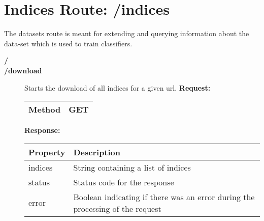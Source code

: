 \section{Indices Route: /indices}
The datasets route is meant for extending and querying information about the data-set which is used to train classifiers. 

\begin{description}


\item [{\large \textbf{/}}]
\item [{\large \textbf{/download}}]
Starts the download of all indices for a given url.
\newline
\newline
\textbf{Request:}
\newline
\newline
\begin{tabular}{ | l | l |}
\hline
Method & GET\\ \hline
\end{tabular}
\newline
\newline
\textbf{Response:}
\newline
\newline
\resizebox{\textwidth}{!} {
\begin{tabular}{ | l | l |}
\hline
\textbf{Property} & \textbf{Description}\\ \hline
indices & String containing a list of indices\\ \hline
status & Status code for the response\\ \hline
error & Boolean indicating if there was an error during the processing of the request\\ \hline
\end{tabular}}

\end{description}